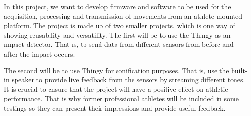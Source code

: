 In this project, we want to develop firmware and software to be used for the acquisition, processing and transmission of movements from an athlete mounted platform. The project is made up of two smaller projects, which is one way of showing reusability and versatility. The first will be to use the Thingy as an impact detector. That is, to send data from different sensors from before and after the impact occurs.

The second will be to use Thingy for sonification purposes. That is, use the built-in speaker to provide live feedback from the sensors by streaming different tones. It is crucial to ensure that the project will have a positive effect on athletic performance. That is why former professional athletes will be included in some testings so they can present their impressions and provide useful feedback.


